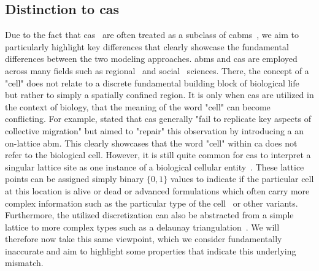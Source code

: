 \subsection{Distinction to \aclp{ca}}
\label{subsubsection:abm-theory-distinction-to-cellular-automata}
Due to the fact that \acp{ca}~\cite{Wolfram1984} are often treated as a subclass of
\acp{cabm}~\cite{Schaller2007}, we aim to particularly highlight key differences that clearly
showcase the fundamental differences between the two modeling approaches.
\acp{abm} and \acp{ca} are employed across many fields such as regional~\cite{Clarke2013} and
social~\cite{Miller2007} sciences.
There, the concept of a "cell" does not relate to a discrete fundamental building block of
biological life but rather to simply a spatially confined region.
It is only when \acp{ca} are utilized in the context of biology, that the meaning of the word "cell"
can become conflicting.
For example, \citet{Deutsch2021} stated that \acp{ca} generally "fail to replicate key aspects of
collective migration" but aimed to "repair" this observation by introducing a an on-lattice
\ac{abm}.
This clearly showcases that the word "cell" within \acl{ca} does not refer to the biological cell.
However, it is still quite common for \acp{ca} to interpret a singular lattice site as one instance
of a biological cellular entity~\cite{Alarcn2003}.
These lattice points can be assigned simply binary $\{0,1\}$ values to indicate if the particular
cell at this location is alive or dead or advanced formulations which often carry more complex
information such as the particular type of the cell~\cite{PATEL2001} or other variants.
Furthermore, the utilized discretization can also be abstracted from a simple lattice to more
complex types such as a delaunay triangulation~\cite{Kansal2000}.
We will therefore now take this same viewpoint, which we consider fundamentally inaccurate and aim
to highlight some properties that indicate this underlying mismatch.

